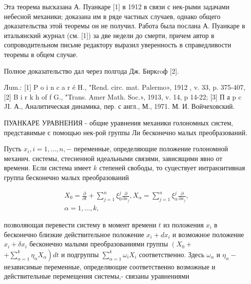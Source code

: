 \documentclass[10pt]{article}
\begin{document}
Эта теорема высказана А. Пуанкаре [1] в 1912 в связи с нек-рыми задачами небесной механики; доказана им в ряде частных случаев, однако общего доказательства этой теоремы он не получил. Работа была послана А. Пуанкаре в итальянский журнал (см. [1]) за две недели до смерти, причем автор в сопроводительном письме редактору выразил уверенность в справедливости теоремы в обцем случае.



Полное доказательство дал через полгода Дж. Биркroф [2].



Лum.: [1] P o i n c a r é H., "Rend. circ. mat. Palermo», 1912 , v. 33, p. 375-407, [2] B i r k h of f G., "Trans. Amer Math. Soc.», 1913, v. 14, p 14-22; [3] П а p c JI. А., Аналитическая динамика, пер. с англ., М., 1971. М. И. Войчеховский.



ПУАНКАРЕ УРАВНЕНИЯ - общие уравнения механики голономных систем, представимые с помощью нек-рой группы Ли бесконечно малых преобразований.



Пусть $x_{i}, i=1, \ldots, n,-$ переменные, определяющие положение голономной механич. системы, стесненной идеальными связями, зависящими явно от времени. Если система имеет $k$ степеней свободы, то суцествует интранзитивная группа бесконечно малых преобразований



\[

\begin{gathered}

X_{0}=\frac{\partial}{\partial t}+\sum_{j=1}^{n} \xi_{0}^{j} \frac{\partial}{\partial x_{j}}, X_{\alpha}=\sum_{j=1}^{n} \xi_{\alpha}^{j} \frac{\partial}{\partial x_{j}}, \\

\alpha=1, \ldots, k,

\end{gathered}

\]



позволяющая перевести систему в момент времени $t$ из положения $x_{i}$ в бесконечно близкие действительное положение $x_{i}+d x_{i}$ и возможное положение $x_{i}+\delta x_{i}$ бесконечно малыми преобразованиями группы $\left(X_{0}+\right.$ $\left.+\sum_{\alpha=1}^{k} \eta_{\alpha} X_{\alpha}\right) d t$ и подгруппы $\sum_{\alpha=1}^{k} \omega_{i} X_{i}$ соответственно. Здесь $\omega_{\alpha}$ и $\eta_{\alpha}-$ независимые переменные, определяющие соответственно возможные и действительные перемещения системы,- связаны уравнениями
\end{document}
